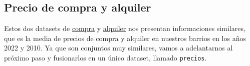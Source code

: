 \documentclass[notspecified,article,submit,moreauthors,pdftex]{Definitions/mdpi}
\newenvironment{Shaded}{\begin{snugshade}}{\end{snugshade}}
\newcommand{\AttributeTok}[1]{\textcolor[rgb]{0.13,0.29,0.53}{#1}}
\newcommand{\FunctionTok}[1]{\textcolor[rgb]{0.13,0.29,0.53}{\textbf{#1}}}
\newcommand{\NormalTok}[1]{#1}
\newcommand{\OtherTok}[1]{\textcolor[rgb]{0.56,0.35,0.01}{#1}}
\newcommand{\SpecialCharTok}[1]{\textcolor[rgb]{0.81,0.36,0.00}{\textbf{#1}}}
\newcommand{\StringTok}[1]{\textcolor[rgb]{0.31,0.60,0.02}{#1}}
\begin{document}
\begin{Shaded}
\end{Shaded}

\hypertarget{precio-de-compra-y-alquiler}{%
\subsection{Precio de compra y
alquiler}\label{precio-de-compra-y-alquiler}}

Estos dos datasets de
\href{https://valencia.opendatasoft.com/explore/dataset/precio-de-compra-en-idealista/table/}{compra}
y
\href{https://valencia.opendatasoft.com/explore/dataset/precio-alquiler-vivienda/table/}{alquiler}
nos presentan informaciones similares, que es la media de precios de
compra y alquiler en nuestros barrios en los años 2022 y 2010. Ya que
son conjuntos muy similares, vamos a adelantarnos al próximo paso y
fusionarlos en un único dataset, llamado \texttt{precios}.
\end{document}
